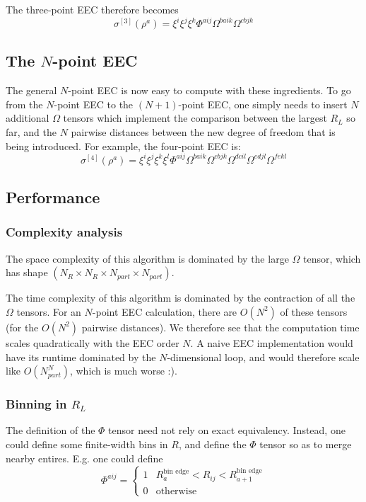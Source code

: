 \documentclass{article}
\begin{document}
The three-point EEC therefore becomes
\begin{equation}
    \sigma^{[3]}(\rho^a) = \xi^i \xi^j \xi^k \Phi^{a i j} \Omega^{b a ik} \Omega^{c b jk} 
\end{equation}

\subsection{The $N$-point EEC}

The general $N$-point EEC is now easy to compute with these ingredients. To go from the $N$-point EEC to the $(N+1)$-point EEC, one simply needs to insert $N$ additional $\Omega$ tensors which implement the comparison between the largest $R_L$ so far, and the $N$ pairwise distances between the new degree of freedom that is being introduced. For example, the four-point EEC is:
\begin{equation}
    \sigma^{[4]}(\rho^a) = \xi^i \xi^j \xi^k \xi^l \Phi^{a i j} \Omega^{b a ik} \Omega^{c b jk} \Omega^{d c il} \Omega^{e d jl} \Omega^{f e kl} 
\end{equation}

\subsection{Performance}

\subsubsection{Complexity analysis}

The space complexity of this algorithm is dominated by the large $\Omega$ tensor, which has shape $(N_{R} \times N_R \times N_{part} \times N_{part})$.

The time complexity of this algorithm is dominated by the contraction of all the $\Omega$ tensors. For an $N$-point EEC calculation, there are $O(N^2)$ of these tensors (for the $O(N^2)$ pairwise distances). We therefore see that the computation time scales quadratically with the EEC order $N$. A naive EEC implementation would have its runtime dominated by the $N$-dimensional loop, and would therefore scale like $O(N_{part}^N)$, which is much worse :). 

\subsubsection{Binning in $R_L$}

The definition of the $\Phi$ tensor need not rely on exact equivalency. Instead, one could define some finite-width bins in $R$, and define the $\Phi$ tensor so as to merge nearby entires. E.g. one could define
\begin{equation}
    \Phi^{aij} = \begin{cases}
        1 & R^{\text{bin edge}}_a < R_{ij} < R^{\text{bin edge}}_{a+1} \\
        0 & \text{otherwise}
    \end{cases}
\end{equation}
\end{document}
